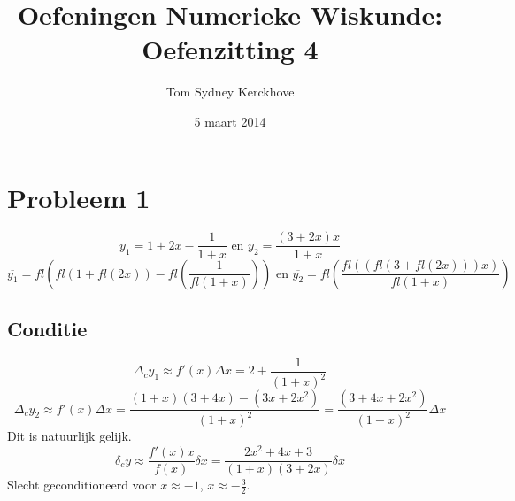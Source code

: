 \documentclass[12pt,a4paper]{article}
\author{Tom Sydney Kerckhove}
\title{Oefeningen Numerieke Wiskunde:\\ Oefenzitting 4}
\date{5 maart 2014}
\begin{document}
\maketitle

\section{Probleem 1}
\[
y_1 = 1+2x-\frac{1}{1+x}
 \text{ en } 
y_2 = \frac{(3+2x)x}{1+x}
\]
\[
\overline{y_1} = fl\left(fl(1+fl(2x))-fl\left(\frac{1}{fl(1+x)}\right)\right)
 \text{ en } 
\overline{y_2} = fl\left(\frac{fl((fl(3+fl(2x)))x)}{fl(1+x)}\right)
\]

\subsection{Conditie}
\[
\Delta_cy_1 \approx f'(x)\Delta x
= 2 + \frac{1}{(1+x)^2}
\]
\[
\Delta_cy_2 \approx f'(x)\Delta x
= \frac{(1+x)(3+4x)-(3x+2x^2)}{(1+x)^2}
= \frac{(3+4x+2x^2)}{(1+x)^2}\Delta
x
\]
Dit is natuurlijk gelijk.
\[
\delta_cy \approx \frac{f'(x)x}{f(x)}\delta x
= \frac{2x^2+4x+3}{(1+x)(3+2x)}\delta x
\]
Slecht geconditioneerd voor $x\approx-1$, $x \approx -\frac{3}{2}$.
\end{document}
